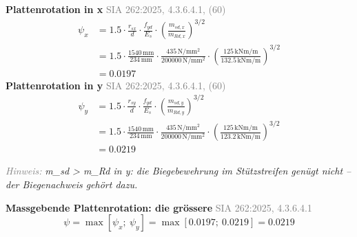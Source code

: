 \documentclass[11pt,a4paper]{article}
\newcommand{\normref}[1]{{\small\textcolor{gray}{#1}}}
\newcommand{\hinweis}[2]{\par\noindent\textcolor{gray}{\textit{#1:}} \textit{#2}\par}
\begin{document}
\noindent\textbf{Plattenrotation in x} \hfill \normref{SIA 262:2025, 4.3.6.4.1, (60)}
\begin{equation*}
\begin{aligned}
  \psi_x &= 1.5 \cdot \frac{r_{sx}}{d} \cdot \frac{f_{yd}}{E_s} \cdot \left(\frac{m_{sd,x}}{m_{Rd,x}}\right)^{3/2} \\
  &= 1.5 \cdot \frac{1540\,\mathrm{mm}}{234\,\mathrm{mm}} \cdot \frac{435\,\mathrm{N}/\mathrm{mm}^{2}}{200000\,\mathrm{N}/\mathrm{mm}^{2}} \cdot \left(\frac{125\,\mathrm{kNm}/\mathrm{m}}{132.5\,\mathrm{kNm}/\mathrm{m}}\right)^{3/2} \\
  &= 0.0197
\end{aligned}
\end{equation*}
\noindent\textbf{Plattenrotation in y} \hfill \normref{SIA 262:2025, 4.3.6.4.1, (60)}
\begin{equation*}
\begin{aligned}
  \psi_y &= 1.5 \cdot \frac{r_{sy}}{d} \cdot \frac{f_{yd}}{E_s} \cdot \left(\frac{m_{sd,y}}{m_{Rd,y}}\right)^{3/2} \\
  &= 1.5 \cdot \frac{1540\,\mathrm{mm}}{234\,\mathrm{mm}} \cdot \frac{435\,\mathrm{N}/\mathrm{mm}^{2}}{200000\,\mathrm{N}/\mathrm{mm}^{2}} \cdot \left(\frac{125\,\mathrm{kNm}/\mathrm{m}}{123.2\,\mathrm{kNm}/\mathrm{m}}\right)^{3/2} \\
  &= 0.0219
\end{aligned}
\end{equation*}
\hinweis{Hinweis}{m\_sd > m\_Rd in y: die Biegebewehrung im Stützstreifen genügt nicht -- der Biegenachweis gehört dazu.}
\noindent\textbf{Massgebende Plattenrotation: die grössere} \hfill \normref{SIA 262:2025, 4.3.6.4.1}
\begin{equation*}
\psi = \max\left[\psi_x;\ \psi_y\right] = \max\left[0.0197;\ 0.0219\right] = 0.0219
\end{equation*}
\end{document}
